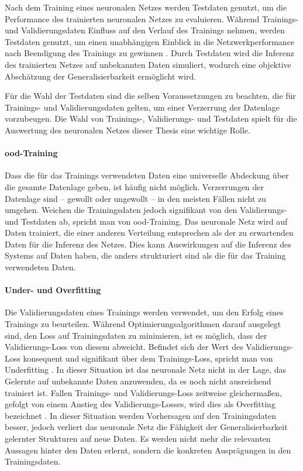 Nach dem Training eines neuronalen Netzes werden Testdaten genutzt, um die Performance des trainierten neuronalen Netzes zu evaluieren. Während Trainings- und Validierungsdaten Einfluss auf den Verlauf des Trainings nehmen, werden Testdaten genutzt, um einen unabhängigen Einblick in die Netzwerkperformance nach Beendigung des Trainings zu gewinnen \cite{nn_terminology}. Durch Testdaten wird die Inferenz des trainierten Netzes auf unbekannten Daten simuliert, wodurch eine objektive Abschätzung der Generalisierbarkeit ermöglicht wird.

Für die Wahl der Testdaten sind die selben Voraussetzungen zu beachten, die für Trainings- und Validierungsdaten gelten, um einer Verzerrung der Datenlage vorzubeugen. Die Wahl von Trainings-, Validierungs- und Testdaten spielt für die Auswertung des neuronalen Netzes dieser Thesis eine wichtige Rolle.

\paragraph{\Acl{ood}-Training}

Dass die für das Trainings verwendeten Daten eine universelle Abdeckung über die gesamte Datenlage geben, ist häufig nicht möglich. Verzerrungen der Datenlage sind -- gewollt oder ungewollt -- in den meisten Fällen nicht zu umgehen. Weichen die Trainingsdaten jedoch signifikant von den Validierungs- und Testdaten ab, spricht man von \Acf{ood}-Training. Das neuronale Netz wird auf Daten trainiert, die einer anderen Verteilung entsprechen als der zu erwartenden Daten für die Inferenz des Netzes. Dies kann Auswirkungen auf die Inferenz des Systems auf Daten haben, die anders strukturiert sind als die für das Training verwendeten Daten.

\paragraph{Under- und Overfitting}

Die Validierungsdaten eines Trainings werden verwendet, um den Erfolg eines Trainings zu beurteilen. Während Optimierungsalgorithmen darauf ausgelegt sind, den Loss auf Trainingsdaten zu minimieren, ist es möglich, dass der Validierungs-Loss von diesem abweicht. Befindet sich der Wert des Validierungs-Loss konsequent und signifikant über dem Trainings-Loss, spricht man von Underfitting \cite{nn_terminology,cv_general}. In dieser Situation ist das neuronale Netz nicht in der Lage, das Gelernte auf unbekannte Daten anzuwenden, da es noch nicht ausreichend trainiert ist. Fallen Trainings- und Validierungs-Loss zeitweise gleichermaßen, gefolgt von einem Anstieg des Validierungs-Losses, wird dies als Overfitting bezeichnet \cite{cv_general}. In dieser Situation werden Vorhersagen auf den Trainingsdaten besser, jedoch verliert das neuronale Netz die Fähigkeit der Generalisierbarkeit gelernter Strukturen auf neue Daten. Es werden nicht mehr die relevanten Aussagen hinter den Daten erlernt, sondern die konkreten Ausprägungen in den Trainingsdaten.


